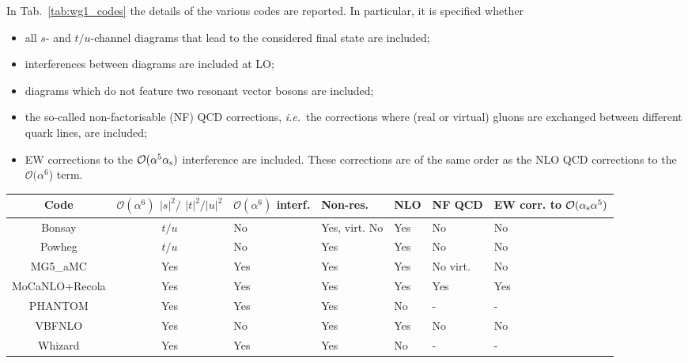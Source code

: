 In Tab.~\ref{tab:wg1_codes} the details of the various codes are reported. In particular, it is specified whether
\begin{itemize}
    \item all $s$- and $t/u$-channel diagrams that lead to the considered final state are included;
    \item interferences between diagrams are included at LO;
    \item diagrams which do not feature two resonant vector bosons are included;
    \item the so-called non-factorisable (NF) QCD corrections, \emph{i.e.}\ the corrections where (real or virtual) gluons are exchanged between different quark lines,
        are included;
    \item EW corrections to the $\mathcal O (\alpha^5\alpha_\text{s})$ interference are included. These corrections are of the same order as the NLO QCD corrections to
        the  $\mathcal O (\alpha^6$) term.
\end{itemize}

\begin{table*}[ht!]
    \footnotesize
    \begin{tabularx}{\textwidth}{c|c|X|X|X|X|X}
        Code  &  $\mathcal O(\alpha^6)$ $|s|^2/$ $|t|^2/|u|^2$  &  $\mathcal O(\alpha^6)$ interf.  &  Non-res.  & NLO &  NF QCD  &  EW corr. to $\mathcal O(\alpha_\text{s} \alpha^5)$  \\
        \hline
        \hline
        {\sc Bonsay}        &  $t/u$    &  No       &  Yes, virt. No    &  Yes   & No       &  No  \\
        {\sc Powheg}        &  $t/u$    &  No       &  Yes              &  Yes   & No       &  No  \\
        {\sc MG5\_aMC}      &  Yes      &  Yes      &  Yes              &  Yes   & No virt. &  No \\
        {\sc MoCaNLO+Recola}&  Yes      &  Yes      &  Yes              &  Yes   & Yes      &  Yes  \\
        {\sc PHANTOM}       &  Yes      &  Yes      &  Yes              &  No    & -        & - \\
        {\sc VBFNLO}        &  Yes      &  No       &  Yes              &  Yes   & No       &  No  \\
        {\sc Whizard}       &  Yes      &  Yes      &  Yes              &  No    & -        & - \\
    \end{tabularx}
    \caption{\label{tab:wg1_codes} Summary of the different properties of the codes employed in the comparison.}
\end{table*}
